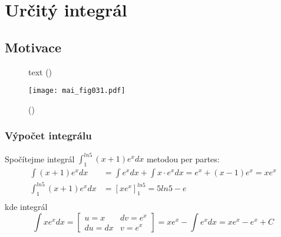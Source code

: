 \chapter{Určitý integrál}
\minitoc

\section{Motivace} 

  \begin{figure}
    \centering
    \caption{text
             (\cite[s.~10000]{Feynman01})}
  \end{figure}

  \begin{figure}[ht!]  %
    \centering
    \texttt{[image: mai\_fig031.pdf]}
    \caption{
            (\cite[s.~10000]{Feynman01})}
    \label{mai:fig031}
  \end{figure}

  \subsection{Výpočet integrálu}
      \begin{example}
        Spočítejme integrál $\displaystyle \int_1^{ln5}{(x+1)e^xdx}$  metodou per partes: 
        \begin{align*}
          \int{(x+1)e^xdx} &= \int{e^xdx}+\int{x\cdot e^xdx}
                            = e^x + (x-1)e^x = xe^x               \\
          \int_1^{ln5}{(x+1)e^xdx} &= [xe^x]_1^{ln5} = 5ln5-e     \\
        \end{align*}
        kde integrál
        \begin{equation*}
            \int{xe^xdx}=
              \left[\begin{array}{cc}
                u=x   & dv=e^x \\
                du=dx & v=e^x
              \end{array}\right]=
              xe^x-\int{e^xdx} = xe^x - e^x+C
        \end{equation*}
      \end{example}

